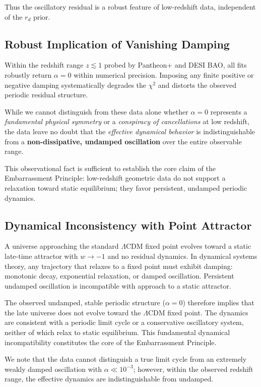 \documentclass[10pt,a4paper,twocolumn]{article}
\begin{document}
Thus the oscillatory residual is a robust feature of low-redshift data, independent of the $r_d$ prior.

\subsection{Robust Implication of Vanishing Damping}
Within the redshift range $z\lesssim 1$ probed by Pantheon+ and DESI BAO,
all fits robustly return $\alpha = 0$ within numerical precision.
Imposing any finite positive or negative damping
systematically degrades the $\chi^2$ and distorts the observed periodic residual structure.

While we cannot distinguish from these data alone
whether $\alpha=0$ represents a \emph{fundamental physical symmetry}
or a \emph{conspiracy of cancellations} at low redshift,
the data leave no doubt that
the \emph{effective dynamical behavior} is indistinguishable from
a \textbf{non-dissipative, undamped oscillation}
over the entire observable range.

This observational fact is sufficient to establish the core claim
of the Embarrassment Principle:
low-redshift geometric data do not support a relaxation toward static equilibrium;
they favor persistent, undamped periodic dynamics.

\subsection{Dynamical Inconsistency with Point Attractor}
A universe approaching the standard $\Lambda$CDM fixed point evolves toward a static late-time attractor with $w\to -1$ and no residual dynamics.
In dynamical systems theory, any trajectory that relaxes to a fixed point must exhibit damping:
monotonic decay, exponential relaxation, or damped oscillation.
Persistent undamped oscillation is incompatible with approach to a static attractor.

The observed undamped, stable periodic structure ($\alpha=0$) therefore implies that
the late universe does not evolve toward the $\Lambda$CDM fixed point.
The dynamics are consistent with a periodic limit cycle or a conservative oscillatory system,
neither of which relax to static equilibrium.
This fundamental dynamical incompatibility constitutes the core of the Embarrassment Principle.

We note that the data cannot distinguish a true limit cycle from an extremely weakly damped oscillation with $\alpha\ll 10^{-3}$;
however, within the observed redshift range, the effective dynamics are indistinguishable from undamped.
\end{document}
